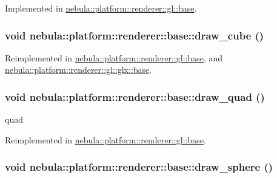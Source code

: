 Implemented in \hyperlink{classnebula_1_1platform_1_1renderer_1_1gl_1_1base_a157b9626fd03370a47898b1c0f7bbe2e}{nebula::platform::renderer::gl::base}.\hypertarget{classnebula_1_1platform_1_1renderer_1_1base_a0da71c3c6f5ee8e7644594c424211271}{
\subsubsection[{draw\_\-cube}]{\setlength{\rightskip}{0pt plus 5cm}void nebula::platform::renderer::base::draw\_\-cube ()}}
\label{classnebula_1_1platform_1_1renderer_1_1base_a0da71c3c6f5ee8e7644594c424211271}


Reimplemented in \hyperlink{classnebula_1_1platform_1_1renderer_1_1gl_1_1base_a4b143fe5c7fa7fe15dc0bf2f30630451}{nebula::platform::renderer::gl::base}, and \hyperlink{classnebula_1_1platform_1_1renderer_1_1gl_1_1glx_1_1base_af6bfad8ac789393e50da7f32ea45817e}{nebula::platform::renderer::gl::glx::base}.\hypertarget{classnebula_1_1platform_1_1renderer_1_1base_a5efb6122adb9602316c6c7aabbf87e1d}{
\subsubsection[{draw\_\-quad}]{\setlength{\rightskip}{0pt plus 5cm}void nebula::platform::renderer::base::draw\_\-quad ()}}
\label{classnebula_1_1platform_1_1renderer_1_1base_a5efb6122adb9602316c6c7aabbf87e1d}


quad 

Reimplemented in \hyperlink{classnebula_1_1platform_1_1renderer_1_1gl_1_1base_acbfb1696354adcef364326a1864dc3fc}{nebula::platform::renderer::gl::base}.\hypertarget{classnebula_1_1platform_1_1renderer_1_1base_ab11ea0309016e4687bbf26808245c3dd}{
\subsubsection[{draw\_\-sphere}]{\setlength{\rightskip}{0pt plus 5cm}void nebula::platform::renderer::base::draw\_\-sphere ()}}
\label{classnebula_1_1platform_1_1renderer_1_1base_ab11ea0309016e4687bbf26808245c3dd}


